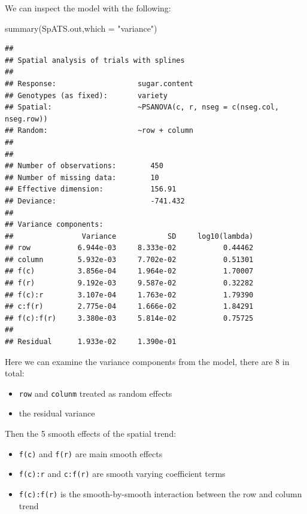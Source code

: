 \documentclass[
]{book}
\newenvironment{Shaded}{\begin{snugshade}}{\end{snugshade}}
\newcommand{\AttributeTok}[1]{\textcolor[rgb]{0.77,0.63,0.00}{#1}}
\newcommand{\FunctionTok}[1]{\textcolor[rgb]{0.00,0.00,0.00}{#1}}
\newcommand{\NormalTok}[1]{#1}
\newcommand{\StringTok}[1]{\textcolor[rgb]{0.31,0.60,0.02}{#1}}
\providecommand{\tightlist}{%
  \setlength{\itemsep}{0pt}\setlength{\parskip}{0pt}}
\begin{document}
We can inspect the model with the following:

\begin{Shaded}
\begin{Highlighting}[]
\FunctionTok{summary}\NormalTok{(SpATS.out,}\AttributeTok{which =} \StringTok{"variance"}\NormalTok{)}
\end{Highlighting}
\end{Shaded}

\begin{verbatim}
## 
## Spatial analysis of trials with splines 
## 
## Response:                   sugar.content
## Genotypes (as fixed):       variety   
## Spatial:                    ~PSANOVA(c, r, nseg = c(nseg.col, nseg.row))
## Random:                     ~row + column
## 
## 
## Number of observations:        450
## Number of missing data:        10
## Effective dimension:           156.91
## Deviance:                      -741.432
## 
## Variance components:
##                Variance            SD     log10(lambda)
## row           6.944e-03     8.333e-02           0.44462
## column        5.932e-03     7.702e-02           0.51301
## f(c)          3.856e-04     1.964e-02           1.70007
## f(r)          9.192e-03     9.587e-02           0.32282
## f(c):r        3.107e-04     1.763e-02           1.79390
## c:f(r)        2.775e-04     1.666e-02           1.84291
## f(c):f(r)     3.380e-03     5.814e-02           0.75725
##                                                        
## Residual      1.933e-02     1.390e-01
\end{verbatim}

Here we can examine the variance components from the model, there are 8 in total:

\begin{itemize}
\tightlist
\item
  \texttt{row} and \texttt{colunm} treated as random effects
\item
  the residual variance
\end{itemize}

Then the 5 smooth effects of the spatial trend:

\begin{itemize}
\tightlist
\item
  \texttt{f(c)} and \texttt{f(r)} are main smooth effects
\item
  \texttt{f(c):r} and \texttt{c:f(r)} are smooth varying coefficient terms
\item
  \texttt{f(c):f(r)} is the smooth-by-smooth interaction between the row and column trend
\end{itemize}
\end{document}
